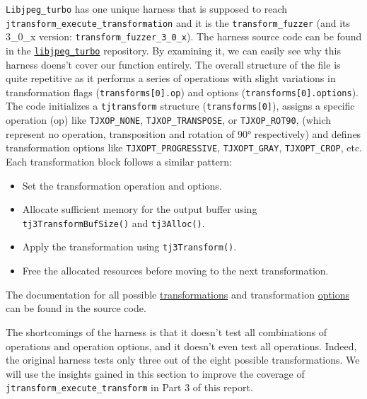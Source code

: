 \documentclass[12pt]{article}
\begin{document}
\noindent \texttt{Libjpeg\_turbo} has one unique harness that is supposed to reach \texttt{jtransform\_execute\_transformation} and it is the \texttt{transform\_fuzzer} (and its 3\_0\_x version: \texttt{transform\_fuzzer\_3\_0\_x}). The harness source code can be found in the \href{https://github.com/libjpeg-turbo/libjpeg-turbo/blob/main/fuzz/transform.cc}{\texttt{libjpeg\_turbo}} repository. By examining it, we can easily see why this harness doens't cover our function entirely. The overall structure of the file is quite repetitive as it performs a series of operations with slight variations in transformation flags (\texttt{transforms[0].op}) and options (\texttt{transforms[0].options}). The code initializes a \texttt{tjtransform} structure (\texttt{transforms[0]}), assigns a specific operation (op) like \texttt{TJXOP\_NONE}, \texttt{TJXOP\_TRANSPOSE}, or \texttt{TJXOP\_ROT90}, (which represent no operation, transposition and rotation of 90° respectively) and defines transformation options like \texttt{TJXOPT\_PROGRESSIVE}, \texttt{TJXOPT\_GRAY}, \texttt{TJXOPT\_CROP}, etc. Each transformation block follows a similar pattern:
\begin{itemize}
    \item Set the transformation operation and options.
    \item  Allocate sufficient memory for the output buffer using \texttt{tj3TransformBufSize()} and \texttt{tj3Alloc()}.
    \item Apply the transformation using \texttt{tj3Transform()}.
    \item Free the allocated resources before moving to the next transformation.
\end{itemize}

\noindent The documentation for all possible \href{https://github.com/libjpeg-turbo/libjpeg-turbo/blob/main/src/turbojpeg.h#L982}{transformations} and transformation \href{https://github.com/libjpeg-turbo/libjpeg-turbo/blob/main/src/turbojpeg.h#L982}{options} can be found in the source code. 

\noindent The shortcomings of the harness is that it doesn't test all combinations of operations and operation options, and it doesn't even test all operations. Indeed, the original harness tests only three out of the eight possible transformations. We will use the insights gained in this section to improve the coverage of \texttt{jtransform\_execute\_transform} in Part 3 of this report. 
\end{document}
